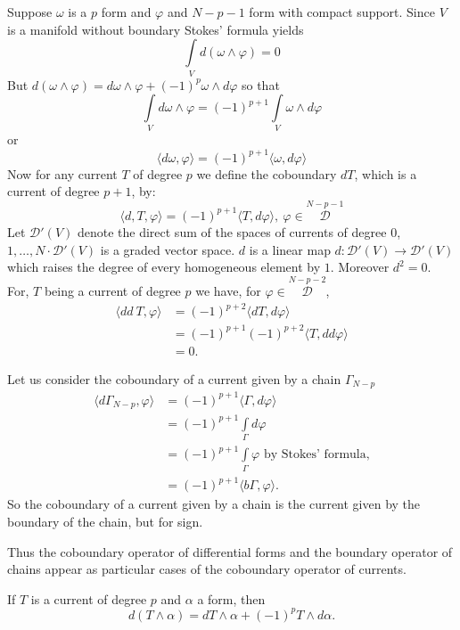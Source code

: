 \begin{enumerate}
Suppose $\omega$ is a $p$ form and $\varphi$ and $N-p-1$ form with
compact support. Since $V$ is a manifold without boundary Stokes'
formula yields
$$
\int\limits_{V}d(\omega\wedge \varphi)=0
$$
But $d(\omega\wedge\varphi)=d\omega\wedge \varphi+(-1)^{p}\omega\wedge
d\varphi$ so that
$$
\int\limits_{V}d\omega\wedge\varphi=(-1)^{p+1}\int\limits_{V}\omega\wedge
d\varphi
$$
or 
$$
\langle d\omega,
\varphi\rangle=(-1)^{p+1}\langle\omega,d\varphi\rangle
$$
Now for any current $T$ of degree $p$ we define the coboundary $dT$,
which is a current of degree $p+1$, by:
$$
\langle d,T,\varphi\rangle =(-1)^{p+1}\langle T,d\varphi\rangle,~
\varphi\in \overset{N-p-1}{\mathscr{D}}
$$
Let $\mathscr{D}'(V)$ denote the direct sum of the spaces of currents
of degree $0$, $1,\ldots,N\cdot \mathscr{D}'(V)$ is a graded vector
space. $d$ is a linear map $d:\mathscr{D}'(V)\to \mathscr{D}'(V)$
which raises the degree of every homogeneous element by $1$. Moreover
$d^{2}=0$. For, $T$ being a current of degree $p$ we have, for
$\varphi\in \overset{N-p-2}{\mathscr{D}}$, 
\begin{align*}
\langle dd\ T,\varphi\rangle &= (-1)^{p+2}\langle dT,d\varphi\rangle\\
 &= (-1)^{p+1}(-1)^{p+2}\langle T,dd\varphi\rangle\\
&=0.
\end{align*}\pageoriginale
\end{enumerate}

Let us consider the coboundary of a current given by a chain
$\Gamma_{N-p}$
\begin{align*}
\langle d\Gamma_{N-p},\varphi\rangle &= (-1)^{p+1}\langle\Gamma,
d\varphi\rangle\\
&= (-1)^{p+1}\int\limits_{\Gamma}d\varphi\\
&= (-1)^{p+1}\int\limits_{\Gamma}\varphi\text{ \ by Stokes'
  formula,}\\
&= (-1)^{p+1}\langle b\Gamma, \varphi\rangle.
\end{align*}
So the coboundary of a current given by a chain is the current given
by the boundary of the chain, but for sign.

Thus the coboundary operator of differential forms and the boundary
operator of chains appear as particular cases of the coboundary
operator of currents.

If $T$ is a current of degree $p$ and $\alpha$ a form, then
$$
d(T\wedge\alpha)=dT\wedge\alpha+(-1)^{p}T\wedge d\alpha.
$$
